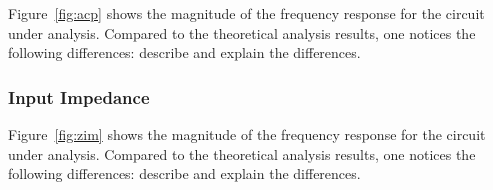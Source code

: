 Figure~\ref{fig:acp} shows the magnitude of the frequency response for the
circuit under analysis. Compared to the theoretical analysis results, one
notices the following differences: describe and explain the differences.


\subsubsection{Input Impedance}

Figure~\ref{fig:zim} shows the magnitude of the frequency response for the
circuit under analysis. Compared to the theoretical analysis results, one
notices the following differences: describe and explain the differences.


